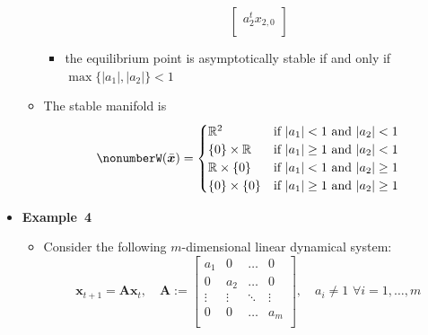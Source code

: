\documentclass[12pt,a4paper]{article}
\begin{document}
\begin{itemize}
\begin{itemize}
\begin{itemize}
\begin{equation}
\begin{bmatrix}
        a_{2}^{t}x_{2,0} \\
      \end{bmatrix}
      \end{equation}
    \item the equilibrium point is asymptotically stable if and only if $\max\{|a_{1}|, |a_{2}|\}<1$
    \end{itemize}
  \item The stable manifold is
    \begin{equation}\nonumber%
      W(\bar{\bm{x}}) =
      \begin{cases}
        \R^{2} & \text{if $|a_{1}|<1$ and $|a_{2}|<1$} \\
        \{0\}\times \R & \text{if $|a_{1}|\geq 1$ and $|a_{2}|<1$} \\
        \R\times \{0\} & \text{if $|a_{1}|< 1$ and $|a_{2}|\geq 1$} \\
        \{0\}\times \{0\} & \text{if $|a_{1}|\geq 1$ and $|a_{2}|\geq 1$} \\
      \end{cases}
    \end{equation}
  \end{itemize}

\item \textbf{Example~4}
  \begin{itemize}
  \item Consider the following $m$-dimensional linear dynamical system:
    \begin{equation}\nonumber%
      \bm{x}_{t+1}
      =
      \bm{A}
      \bm{x}_{t},
      \quad
      \bm{A}:=
      \begin{bmatrix}
        a_{1} & 0 & \ldots & 0 \\
        0 & a_{2} & \ldots & 0 \\
        \vdots & \vdots & \ddots & \vdots \\
        0 & 0 & \ldots & a_{m} \\
      \end{bmatrix},
      \quad a_{i} \neq 1 \,\, \forall i = 1, \ldots, m
    \end{equation}


\end{itemize}
\end{itemize}
\end{document}
